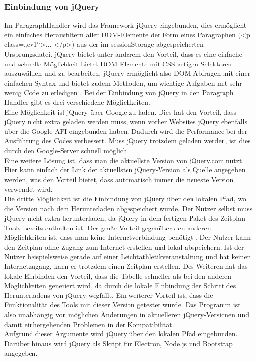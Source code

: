 \subsubsection{Einbindung von jQuery}
Im ParagraphHandler wird das Framework jQuery eingebunden, dies ermöglicht ein einfaches Herausfiltern aller DOM-Elemente der Form eines Paragraphen (<p class=„ev1“>... </p>) aus der im sessionStorage abgespeicherten Ursprungsdatei. jQuery bietet unter anderem den Vorteil, dass es eine einfache und schnelle Möglichkeit bietet DOM-Elemente mit CSS-artigen Selektoren auszuwählen und zu bearbeiten. jQuery ermöglicht also DOM-Abfragen mit einer einfachen Syntax und bietet zudem Methoden, um wichtige Aufgaben mit sehr wenig Code zu erledigen \cite[S. 294ff.]{duckett}. Bei der Einbindung von jQuery in den Paragraph Handler gibt es drei verschiedene Möglichkeiten.\\
Eine Möglichkeit ist jQuery über Google zu laden. Dies hat den Vorteil, dass jQuery nicht extra geladen werden muss, wenn vorher Websites jQuery ebenfalls über die Google-API eingebunden haben. Dadurch wird die Performance bei der Ausführung des Codes verbessert. Muss jQuery trotzdem geladen werden, ist dies durch den Google-Server schnell möglich. \\
Eine weitere Lösung ist, dass man die aktuellste Version von jQuery.com nutzt. Hier kann einfach der Link der aktuellsten jQuery-Version als Quelle angegeben werden, was den Vorteil bietet, dass automatisch immer die neueste Version verwendet wird. \\
Die dritte Möglichkeit ist die Einbindung von jQuery über den lokalen Pfad, wo die Version nach dem Herunterladen abgespeichert wurde. Der Nutzer selbst muss jQuery nicht extra herunterladen, da jQuery in dem fertigen Paket des Zeitplan-Tools bereits enthalten ist. Der große Vorteil gegenüber den anderen Möglichkeiten ist, dass man keine Internetverbindung benötigt \cite{jQuery}. Der Nutzer kann den Zeitplan ohne Zugang zum Internet erstellen und lokal abspeichern. Ist der Nutzer beispielsweise gerade auf einer Leichtathletikveranstaltung und hat keinen Internetzugang, kann er trotzdem einen Zeitplan erstellen. Des Weiteren hat das lokale Einbinden den Vorteil, dass die Tabelle schneller als bei den anderen Möglichkeiten generiert wird, da durch die lokale Einbindung der Schritt des Herunterladens von jQuery wegfällt. Ein weiterer Vorteil ist, dass die Funktionalität des Tools mit dieser Version getestet wurde. Das Programm ist also unabhängig von möglichen Änderungen in aktuelleren jQuery-Versionen und damit einhergehenden Problemen in der Kompatibilität. \\
Aufgrund dieser Argumente wird jQuery über den lokalen Pfad eingebunden.  
Darüber hinaus wird jQuery als Skript für Electron, Node.js und Bootstrap angegeben. 

